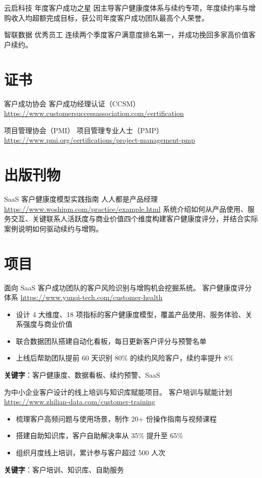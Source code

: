 \documentclass[a4paper, serif, 10pt]{moderncv}
\begin{document}
        {云启科技}
        {年度客户成功之星}
        {}
        {}
        {因主导客户健康度体系与续约专项，年度续约率与增购收入均超额完成目标，获公司年度客户成功团队最高个人荣誉。}

        {智联数据}
        {优秀员工}
        {}
        {}
        {连续两个季度客户满意度排名第一，并成功挽回多家高价值客户续约。}
\section{证书}

        {客户成功协会}
        {客户成功经理认证（CCSM）}
        {\url{https://www.customersuccessassociation.com/certification}}
        {}
        {}

        {项目管理协会（PMI）}
        {项目管理专业人士（PMP）}
        {\url{https://www.pmi.org/certifications/project-management-pmp}}
        {}
        {}
\section{出版刊物}

        {SaaS 客户健康度模型实践指南}
        {人人都是产品经理}
        {\url{https://www.woshipm.com/practice/example.html}}
        {}
        {系统介绍如何从产品使用、服务交互、关键联系人活跃度与商业价值四个维度构建客户健康度评分，并结合实际案例说明如何驱动续约与增购。}
\section{项目}

        {面向 SaaS 客户成功团队的客户风险识别与增购机会挖掘系统。}
        {客户健康度评分体系}
        {\url{https://www.yunqi-tech.com/customer-health}}
        {}
        {\begin{itemize}
\item 设计 4 大维度、18 项指标的客户健康度模型，覆盖产品使用、服务体验、关系强度与商业价值
\item 联合数据团队搭建自动化看板，每日更新客户评分与预警名单
\item 上线后帮助团队提前 60 天识别 80\% 的续约风险客户，续约率提升 8\%
\end{itemize}
\textbf{关键字}：客户健康度、数据看板、续约预警、SaaS}

        {为中小企业客户设计的线上培训与知识库赋能项目。}
        {客户培训与赋能计划}
        {\url{https://www.zhilian-data.com/customer-training}}
        {}
        {\begin{itemize}
\item 梳理客户高频问题与使用场景，制作 20+ 份操作指南与视频课程
\item 搭建自助知识库，客户自助解决率从 35\% 提升至 65\%
\item 组织月度线上培训，累计参与客户超过 500 人次
\end{itemize}
\textbf{关键字}：客户培训、知识库、自助服务}
\end{document}
